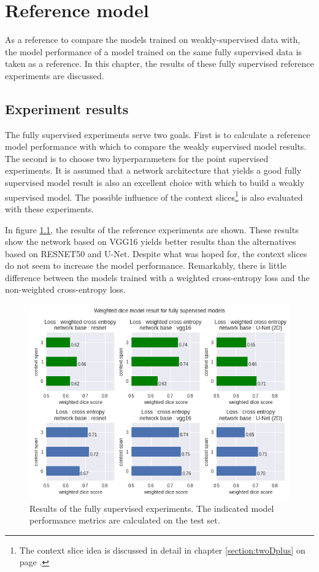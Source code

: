 \chapter{Reference model\label{sec:reference_model}}
\par{
    As a reference to compare the models trained on weakly-supervised data with, the model performance of a model trained on the same fully supervised data is taken as a reference.
    In this chapter, the results of these fully supervised reference experiments are discussed.
}

\section{Experiment results}
\par{
    The fully supervised experiments serve two goals.
    First is to calculate a reference model performance with which to compare the weakly supervised model results.
    The second is to choose two hyperparameters for the point supervised experiments.
    It is assumed that a network architecture that yields a good fully supervised model result is also an excellent choice with which to build a weakly supervised model.
    The possible influence of the context slices\footnote{The context slice idea is discussed in detail in chapter \ref{section:twoDplus} on page \pageref{section:twoDplus}.} is also evaluated with these experiments.
}
\par{
    In figure \ref{fig:referenceExperiments}, the results of the reference experiments are shown.
    These results show the network based on VGG16 yields better results than the alternatives based on RESNET50 and U-Net.
    Despite what was hoped for, the context slices do not seem to increase the model performance.
    Remarkably, there is little difference between the models trained with a weighted cross-entropy loss and the non-weighted cross-entropy loss.
}
\begin{figure}
    \centering
    \includegraphics[width=.95\textwidth]{images/FullySupervised.png}
    \caption{Results of the fully supervised experiments.
    The indicated model performance metrics are calculated on the test set.
    \label{fig:referenceExperiments}}
\end{figure}


